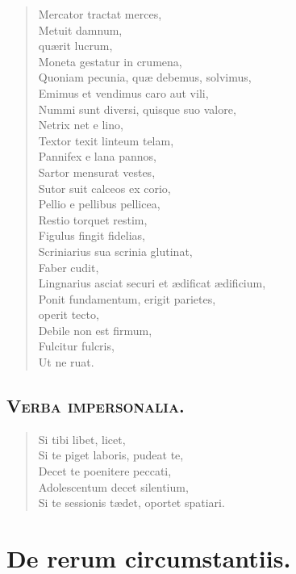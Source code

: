 \begin{verse}
  Mercator tractat merces,\\
  Metuit damnum,\\
  quærit lucrum,\\
  Moneta gestatur in crumena,\\
  Quoniam pecunia, quæ debemus, solvimus,\\
  Emimus et vendimus caro aut vili,\\
  Nummi sunt diversi, quisque suo valore,\\
  Netrix net e lino,\\
  Textor texit linteum telam,\\
  Pannifex e lana pannos,\\
  Sartor mensurat vestes,\\
  Sutor suit calceos ex corio,\\
  Pellio e pellibus pellicea,\\
  Restio torquet restim,\\
  Figulus fingit fidelias,\\
  Scriniarius sua scrinia glutinat,\\
  Faber cudit,\\
  Lingnarius asciat securi et ædificat ædificium,\\
  Ponit fundamentum, erigit parietes,\\
  operit tecto,\\
  Debile non est firmum,\\
  Fulcitur fulcris,\\
  Ut ne ruat.\\
\end{verse}



\section*{\textsc{Verba impersonalia.}}


\begin{verse}

  Si tibi libet, licet,\\
  Si te piget laboris, pudeat te,\\
  Decet te poenitere peccati,\\
  Adolescentum decet silentium,\\
  Si te sessionis tædet, oportet spatiari.\\
\end{verse}



\chapter{De rerum circumstantiis.}


